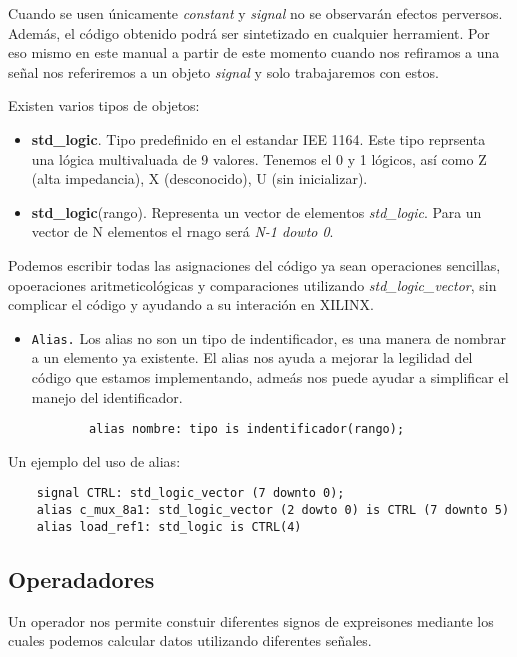 Cuando se usen únicamente \textit{constant} y \textit{signal} no se observarán efectos perversos. Además, el código obtenido podrá ser sintetizado en cualquier herramient. Por eso mismo en este manual a partir de este momento cuando nos refiramos a una señal nos referiremos a un objeto \textit{signal} y solo trabajaremos con estos. 

Existen varios tipos de objetos: 

\begin{itemize}
    \item \textbf{std\_logic}. Tipo predefinido en el estandar IEE 1164. Este tipo reprsenta una lógica multivaluada de 9 valores. Tenemos el 0 y 1 lógicos, así como Z (alta impedancia), X (desconocido), U (sin inicializar).
    \item  \textbf{std\_logic}(rango). Representa un vector de elementos \textit{std\_logic}. Para un vector de N elementos el rnago será \textit{N-1 dowto 0}. 
\end{itemize}
Podemos escribir todas las asignaciones del código ya sean operaciones sencillas, opoeraciones aritmeticológicas y comparaciones utilizando \textit{std\_logic\_vector}, sin complicar el código y ayudando a su interación en XILINX. 

\begin{itemize}
    \item \texttt{Alias.} Los alias no son un tipo de indentificador, es una manera de nombrar a un elemento ya existente. El alias nos ayuda a mejorar la legilidad del código que estamos implementando, admeás nos puede ayudar a simplificar el manejo del identificador. 
    \begin{lstlisting}
        alias nombre: tipo is indentificador(rango);
    \end{lstlisting}
\end{itemize}
Un ejemplo del uso de alias: 

\begin{lstlisting}
    signal CTRL: std_logic_vector (7 downto 0); 
    alias c_mux_8a1: std_logic_vector (2 dowto 0) is CTRL (7 downto 5)
    alias load_ref1: std_logic is CTRL(4)
\end{lstlisting}

\subsection{Operadadores}

Un operador nos permite constuir diferentes signos de expreisones mediante los cuales podemos calcular datos utilizando diferentes señales. 


